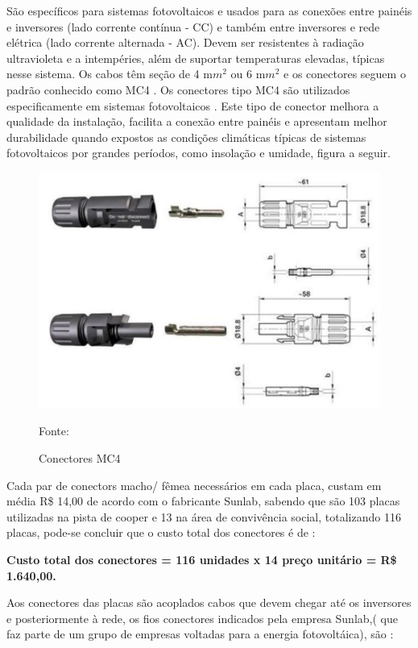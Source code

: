 	S\~ao espec\'ificos para sistemas fotovoltaicos e usados para as conex\~oes entre pain\'eis e inversores (lado corrente cont\'inua - CC) e tamb\'em entre inversores e rede el\'etrica (lado corrente alternada - AC). Devem ser resistentes \`a radia\c{c}\~ao ultravioleta e a intemp\'eries, al\'em de suportar temperaturas elevadas, t\'ipicas nesse sistema. Os cabos t\^em se\c{c}\~ao de 4 m$m^{2}$ ou 6 m$m^{2}$ e os conectores seguem o padr\~ao conhecido como MC4 \cite{NEOSOLAR}.
	Os conectores tipo MC4 s\~ao utilizados especificamente em  sistemas fotovoltaicos . Este tipo de conector melhora a qualidade da instala\c{c}\~ao, facilita a conex\~ao entre pain\'eis e apresentam melhor durabilidade quando expostos as condi\c{c}\~oes clim\'aticas t\'ipicas de sistemas fotovoltaicos por grandes per\'iodos, como insola\c{c}\~ao e umidade, figura a seguir.
	
\begin{figure}[H]
	\centering
	\label{ConectoresMC4}
		\includegraphics[keepaspectratio=true,scale=0.9]{figuras/ConectoresMC4.png}
	\caption{Conectores MC4}
	\small{Fonte: \cite{NEOSOLAR} }
\end{figure}
	
	Cada par de conectors macho/ f\^emea necess\'arios em cada placa, custam  em m\'edia R\$ 14,00 de acordo com o fabricante Sunlab, sabendo que s\~ao 103 placas utilizadas na pista de cooper e 13 na \'area de conviv\^encia social, totalizando 116 placas, pode-se concluir que o custo total dos conectores \'e de :
	
	\textbf{Custo total dos conectores = 116 unidades x 14 pre\c{c}o unit\'ario = R\$ 1.640,00.}
	
	Aos conectores das placas s\~ao acoplados cabos que devem chegar at\'e os inversores e posteriormente \`a rede, os fios conectores indicados pela empresa Sunlab,( que faz parte de um grupo de empresas voltadas para a energia fotovolt\'aica), s\~ao :
	
